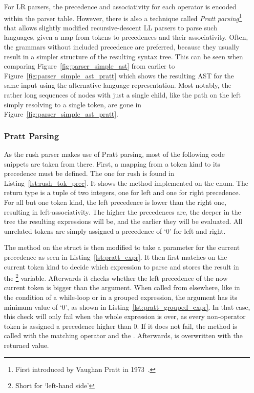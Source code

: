 For LR parsers, the precedence and associativity for each operator is encoded within the parser table.
However, there is also a technique called \emph{Pratt parsing}\footnote{First introduced by Vaughan Pratt in 1973~\cite{Pratt1973}.} that allows slightly modified recursive-descent LL parsers to parse such languages, given a map from tokens to precedences and their associativity.
Often, the grammars without included precedence are preferred, because they usually result in a simpler structure of the resulting syntax tree.
This can be seen when comparing Figure~\ref{fig:parser_simple_ast} from earlier to Figure~\ref{fig:parser_simple_ast_pratt} which shows the resulting AST for the same input using the alternative language representation.
Most notably, the rather long sequences of nodes with just a single child, like the path on the left simply resolving to a single  token, are gone in Figure~\ref{fig:parser_simple_ast_pratt}.

\subsubsection{Pratt Parsing}

As the rush parser makes use of Pratt parsing, most of the following code snippets are taken from there.
First, a mapping from a token kind to its precedence must be defined.
The one for rush is found in Listing~\ref{lst:rush_tok_prec}.
It shows the  method implemented on the  enum.
The return type is a tuple of two integers, one for left and one for right precedence.
For all but one token kind, the left precedence is lower than the right one, resulting in left-associativity.
The higher the precedences are, the deeper in the tree the resulting expressions will be, and the earlier they will be evaluated.
All unrelated tokens are simply assigned a precedence of `0' for left and right.


The  method on the  struct is then modified to take a parameter for the current precedence as seen in Listing~\ref{lst:pratt_expr}.
It then first matches on the current token kind to decide which expression to parse and stores the result in the \footnote{Short for `left-hand side'} variable.
Afterwards it checks whether the left precedence of the now current token is bigger than the  argument.
When called from elsewhere, like in the condition of a while-loop or in a grouped expression, the  argument has its minimum value of `0', as shown in Listing~\ref{lst:pratt_grouped_expr}.
In that case, this check will only fail when the whole expression is over, as every non-operator token is assigned a precedence higher than 0.
If it does not fail, the  method is called with the matching operator and the .
Afterwards,  is overwritten with the returned value.

